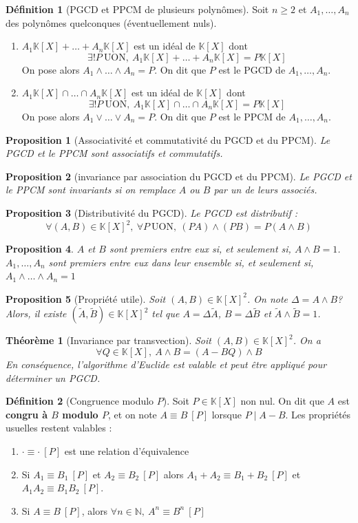 \documentclass[french]{book}
\newcommand{\N}{\mathbb{N}}
\newcommand{\K}{\mathbb{K}}
\theoremstyle{plain}
\newtheorem{thm}{Théorème}[chapter]
\newtheorem{prop}{Proposition}[chapter]
\theoremstyle{definition}
\newtheorem{dfn}{Définition}[chapter]
\theoremstyle{remark}
\begin{document}
\begin{dfn}[PGCD et PPCM de plusieurs polynômes]
	Soit $n\geqslant2$ et $A_1,\ldots,A_n$ des polynômes quelconques (éventuellement nuls).
	\begin{enumerate}
		\item $A_1\K[X]+\ldots+A_n\K[X]$ est un idéal de $\K[X]$ dont $$\exists!P\ \text{UON},\ A_1\K[X]+\ldots+A_n\K[X]=P\K[X]$$ On pose alors $A_1\wedge\ldots\wedge A_n=P$. On dit que $P$ est le PGCD de $A_1,\ldots,A_n$.
		\item $A_1\K[X]\cap\ldots\cap A_n\K[X]$ est un idéal de $\K[X]$ dont $$\exists!P\ \text{UON},\ A_1\K[X]\cap\ldots\cap A_n\K[X]=P\K[X]$$ On pose alors $A_1\vee\ldots\vee A_n=P$. On dit que $P$ est le PPCM de $A_1,\ldots,A_n$.
	\end{enumerate}
\end{dfn}
\begin{prop}[Associativité et commutativité du PGCD et du PPCM]
	Le PGCD et le PPCM sont associatifs et commutatifs.
\end{prop}
\begin{prop}[invariance par association du PGCD et du PPCM]
	Le PGCD et le PPCM sont invariants si on remplace $A$ ou $B$ par un de leurs associés.
\end{prop}
\begin{prop}[Distributivité du PGCD]
	Le PGCD est distributif : $$\forall (A,B)\in\K[X]^2,\ \forall P \ \text{UON},\ (PA)\wedge(PB)=P(A\wedge B)$$
\end{prop}
\begin{prop}
	$A$ et $B$ sont premiers entre eux si, et seulement si, $A\wedge B=1$. 	$A_1,\ldots,A_n$ sont premiers entre eux dans leur ensemble si, et seulement si, $A_1\wedge\ldots\wedge A_n=1$
\end{prop}
\begin{prop}[Propriété utile]
	Soit $(A,B)\in\K[X]^2$. On note $\Delta=A\wedge B$? Alors, il existe $(\tilde{A},\tilde{B})\in\K[X]^2$ tel que $A=\Delta\tilde{A}$, $B=\Delta\tilde{B}$ et $\tilde{A}\wedge\tilde{B}=1$.
\end{prop}
\begin{thm}[Invariance par transvection]
	Soit $(A,B)\in\K[X]^2$. On a $$\forall Q\in\K[X],\ A\wedge B = (A-BQ)\wedge B$$ En conséquence, l'algorithme d'Euclide est valable et peut être appliqué pour déterminer un PGCD.
\end{thm}
\begin{dfn}[Congruence modulo $P$]
	Soit $P\in\K[X]$ non nul. On dit que $A$ est \textbf{congru à $B$ modulo $P$}, et on note $A\equiv B \ [P]$ lorsque $P\mid A-B$. Les propriétés usuelles restent valables :
	\begin{enumerate}
		\item $\cdot\equiv\cdot\ [P]$ est une relation d'équivalence
		\item Si $A_1\equiv B_1 \ [P]$ et $A_2\equiv B_2 \ [P]$ alors $A_1+A_2\equiv B_1+B_2 \ [P]$ et $A_1A_2\equiv B_1B_2 \ [P]$.
		\item Si $A\equiv B \ [P]$, alors $\forall n\in\N,\ A^n\equiv B^n \ [P]$
	\end{enumerate}
\end{dfn}
\end{document}
